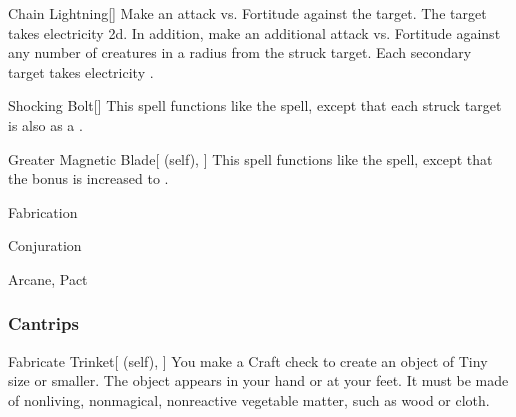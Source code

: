 \lowercase{\hypertarget{spell:Chain Lightning}{}}\label{spell:Chain Lightning}
\begin{freeability}[Rank 5]{\hypertarget{spell:Chain Lightning}{Chain Lightning}}[]
Make an attack vs. Fortitude against the target.
\hit The target takes electricity  \plus2d.
In addition, make an additional attack vs. Fortitude against any number of creatures in a \areasmall radius from the struck target.
\hit Each secondary target takes electricity .
\end{freeability}
\vspace{0.25em}



\lowercase{\hypertarget{spell:Shocking Bolt}{}}\label{spell:Shocking Bolt}
\begin{freeability}[Rank 5]{\hypertarget{spell:Shocking Bolt}{Shocking Bolt}}[]
This spell functions like the  spell, except that each struck target is also  as a .
\end{freeability}
\vspace{0.25em}



\lowercase{\hypertarget{spell:Greater Magnetic Blade}{}}\label{spell:Greater Magnetic Blade}
\begin{attuneability}[Rank 7]{\hypertarget{spell:Greater Magnetic Blade}{Greater Magnetic Blade}}[ (self), ]
This spell functions like the  spell, except that the bonus is increased to .
\end{attuneability}
\vspace{0.25em}


\newpage
\begin{spellsection}{Fabrication}

\begin{spellheader}
\end{spellheader}


 Conjuration

 Arcane, Pact

\subsubsection{Cantrips}


\begin{attuneability}{Fabricate Trinket}[ (self), ]
You make a Craft check to create an object of Tiny size or smaller.
The object appears in your hand or at your feet.
It must be made of nonliving, nonmagical, nonreactive vegetable matter, such as wood or cloth.
\end{attuneability}

\end{spellsection}


